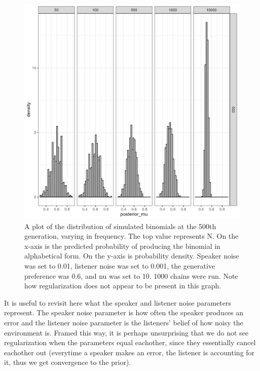 \documentclass[10pt, letterpaper]{article}
\newenvironment{CodeChunk}{}{}
\begin{document}
\begin{CodeChunk}
\begin{figure}[tb]

{\centering \includegraphics[width=1\linewidth]{Figures/speaker_noise_01_listener_001} 

}

\caption[A plot of the distribution of simulated binomials at the 500th generation, varying in frequency]{A plot of the distribution of simulated binomials at the 500th generation, varying in frequency. The top value represents N. On the x-axis is the predicted probability of producing the binomial in alphabetical form. On the y-axis is probability density. Speaker noise was set to 0.01, listener noise was set to 0.001, the generative preference was 0.6, and nu was set to 10. 1000 chains were run. Note how regularization does not appear to be present in this graph.}\label{fig:regularizationplot2}
\end{figure}
\end{CodeChunk}

It is useful to revisit here what the speaker and listener noise
parameters represent. The speaker noise parameter is how often the
speaker produces an error and the listener noise parameter is the
listeners' belief of how noisy the environment is. Framed this way, it
is perhaps unsurprising that we do not see regularization when the
parameters equal eachother, since they essentially cancel eachother out
(everytime a speaker makes an error, the listener is accounting for it,
thus we get convergence to the prior).
\end{document}
